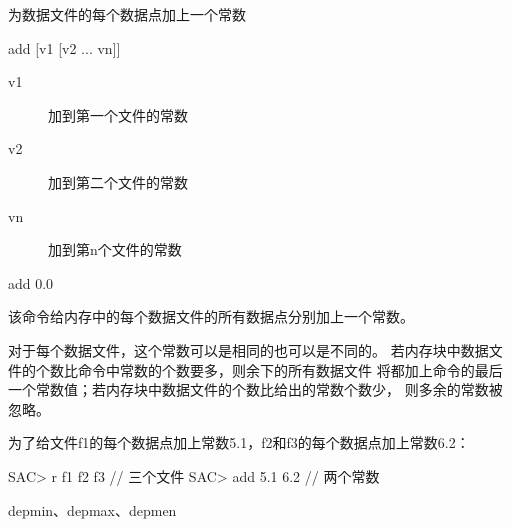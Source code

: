 \label{cmd:add}

为数据文件的每个数据点加上一个常数

\begin{SACSTX}
add [v1 [v2 ... vn]]
\end{SACSTX}

\begin{description}
\item [v1] 加到第一个文件的常数
\item [v2] 加到第二个文件的常数
\item [vn] 加到第n个文件的常数
\end{description}

\begin{SACDFT}
add 0.0
\end{SACDFT}

该命令给内存中的每个数据文件的所有数据点分别加上一个常数。

对于每个数据文件，这个常数可以是相同的也可以是不同的。
若内存块中数据文件的个数比命令中常数的个数要多，则余下的所有数据文件
将都加上命令的最后一个常数值；若内存块中数据文件的个数比给出的常数个数少，
则多余的常数被忽略。

为了给文件f1的每个数据点加上常数5.1，f2和f3的每个数据点加上常数6.2：
\begin{SACCode}
SAC> r f1 f2 f3         // 三个文件
SAC> add 5.1 6.2        // 两个常数
\end{SACCode}

depmin、depmax、depmen

